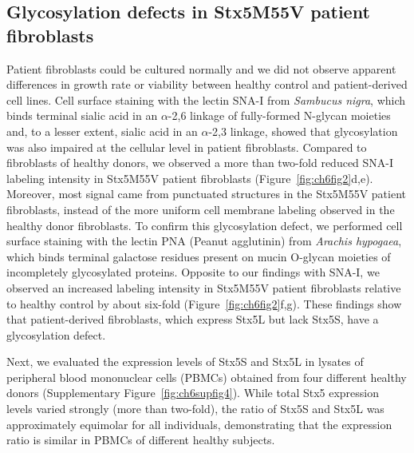 \subsection{Glycosylation defects in Stx5M55V patient fibroblasts}

Patient fibroblasts could be cultured normally and we did not observe apparent differences in growth rate or viability between healthy control and patient-derived cell lines. Cell surface staining with the lectin SNA-I from \emph{Sambucus nigra}, which binds terminal sialic acid in an $\alpha$-2,6 linkage of fully-formed N-glycan moieties and, to a lesser extent, sialic acid in an $\alpha$-2,3 linkage, showed that glycosylation was also impaired at the cellular level in patient fibroblasts. Compared to fibroblasts of healthy donors, we observed a more than two-fold reduced SNA-I labeling intensity in Stx5M55V patient fibroblasts (Figure~\ref{fig:ch6fig2}d,e). Moreover, most signal came from punctuated structures in the Stx5M55V patient fibroblasts, instead of the more uniform cell membrane labeling observed in the healthy donor fibroblasts. To confirm this glycosylation defect, we performed cell surface staining with the lectin PNA (Peanut agglutinin) from \emph{Arachis hypogaea}, which binds terminal galactose residues present on mucin O-glycan moieties of incompletely glycosylated proteins. Opposite to our findings with SNA-I, we observed an increased labeling intensity in Stx5M55V patient fibroblasts relative to healthy control by about six-fold (Figure~\ref{fig:ch6fig2}f,g). These findings show that patient-derived fibroblasts, which express Stx5L but lack Stx5S, have a glycosylation defect. 

Next, we evaluated the expression levels of Stx5S and Stx5L in lysates of peripheral blood mononuclear cells (PBMCs) obtained from four different healthy donors (Supplementary Figure~\ref{fig:ch6supfig4}). While total Stx5 expression levels varied strongly (more than two-fold), the ratio of Stx5S and Stx5L was approximately equimolar for all individuals, demonstrating that the expression ratio is similar in PBMCs of different healthy subjects.

